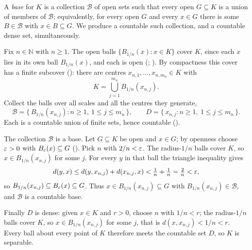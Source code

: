 \documentclass[main.tex]{subfiles}
\begin{document}
\begin{Solution}
A \emph{base} for $K$ is a collection $\mathcal B$ of open sets such that every open $G\subseteq K$ is a
union of members of $\mathcal B$; equivalently, for every open $G$ and every $x\in G$ there is some
$B\in\mathcal B$ with $x\in B\subseteq G$. We produce a countable such collection, and a countable dense
set, simultaneously.

Fix $n\in\mathbb N$ with $n\ge 1$. The open balls $\{B_{1/n}(x):x\in K\}$ cover $K$, since each $x$ lies
in its own ball $B_{1/n}(x)$, and each is open (; ). By compactness this cover has a finite subcover (): there are centres
$x_{n,1},\dots,x_{n,m_n}\in K$ with
\[
  K=\bigcup_{j=1}^{m_n}B_{1/n}(x_{n,j}).
\]
Collect the balls over all scales and all the centres they generate,
\[
  \mathcal B=\bigl\{\,B_{1/n}(x_{n,j}):n\ge 1,\ 1\le j\le m_n\,\bigr\},
  \qquad
  D=\bigl\{\,x_{n,j}:n\ge 1,\ 1\le j\le m_n\,\bigr\}.
\]
Each is a countable union of finite sets, hence countable ().

The collection $\mathcal B$ is a base. Let $G\subseteq K$ be open and $x\in G$; by openness choose
$\varepsilon>0$ with $B_\varepsilon(x)\subseteq G$ (). Pick $n$ with $2/n<\varepsilon$. The radius-$1/n$ balls
cover $K$, so $x\in B_{1/n}(x_{n,j})$ for some $j$. For every $y$ in that ball the triangle inequality
gives
\[
  d(y,x)\le d(y,x_{n,j})+d(x_{n,j},x)<\tfrac1n+\tfrac1n=\tfrac2n<\varepsilon,
\]
so $B_{1/n}(x_{n,j})\subseteq B_\varepsilon(x)\subseteq G$. Thus $x\in B_{1/n}(x_{n,j})\subseteq G$ with
$B_{1/n}(x_{n,j})\in\mathcal B$, and $\mathcal B$ is a countable base.

Finally $D$ is dense: given $x\in K$ and $r>0$, choose $n$ with $1/n<r$; the radius-$1/n$ balls cover
$K$, so $x\in B_{1/n}(x_{n,j})$ for some $j$, that is $d(x,x_{n,j})<1/n<r$. Every ball about every point
of $K$ therefore meets the countable set $D$, so $K$ is separable.
\end{Solution}
\end{document}
